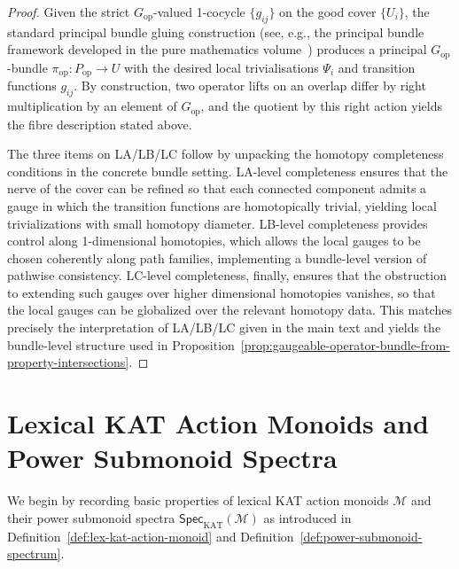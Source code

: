 \documentclass[11pt]{book}
\theoremstyle{plain}
\theoremstyle{definition}
\theoremstyle{remark}
\begin{document}
\begin{proof}
Given the strict $G_{\mathrm{op}}$-valued 1-cocycle
$\{g_{ij}\}$ on the good cover $\{U_i\}$, the standard principal
bundle gluing construction (see, e.g., the principal bundle framework
developed in the pure mathematics volume~\cite{GaoZheng2025GFramework})
produces a principal $G_{\mathrm{op}}$-bundle 
$\pi_{\mathrm{op}} \colon P_{\mathrm{op}} \to U$ with the desired
local trivialisations $\Psi_i$ and transition functions $g_{ij}$. By
construction, two operator lifts on an overlap differ by right
multiplication by an element of $G_{\mathrm{op}}$, and the quotient
by this right action yields the fibre description stated above.

The three items on LA/LB/LC follow by unpacking the homotopy
completeness conditions in the concrete bundle setting. LA-level
completeness ensures that the nerve of the cover can be refined so
that each connected component admits a gauge in which the transition
functions are homotopically trivial, yielding local trivializations
with small homotopy diameter. LB-level completeness provides control
along 1-dimensional homotopies, which allows the local gauges to be
chosen coherently along path families, implementing a bundle-level
version of pathwise consistency. LC-level completeness, finally,
ensures that the obstruction to extending such gauges over higher
dimensional homotopies vanishes, so that the local gauges can be
globalized over the relevant homotopy data. This matches precisely the
interpretation of LA/LB/LC given in the main text and yields the
bundle-level structure used in
Proposition~\ref{prop:gaugeable-operator-bundle-from-property-intersections}.
\end{proof}

\section{Lexical KAT Action Monoids and Power Submonoid Spectra}

We begin by recording basic properties of lexical KAT action monoids
$\mathcal{M}$ and their power submonoid spectra
$\mathsf{Spec}_{\mathrm{KAT}}(\mathcal{M})$ as introduced in
Definition~\ref{def:lex-kat-action-monoid} and
Definition~\ref{def:power-submonoid-spectrum}.
\end{document}
